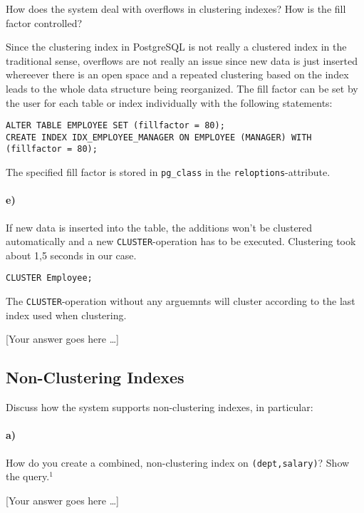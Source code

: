 \documentclass[11pt]{scrartcl}
\newcommand{\youranswerhere}{[Your answer goes here \ldots]}
\begin{document}
How does the system deal with overflows in clustering indexes? How is the fill factor controlled?

Since the clustering index in PostgreSQL is not really a clustered index in the traditional sense, overflows are not really an issue since new data is just inserted whereever there is an open space and a repeated clustering based on the index leads to the whole data structure being reorganized.
The fill factor can be set by the user for each table or index individually with the following statements:

\begin{lstlisting}[style=dbtsql]
ALTER TABLE EMPLOYEE SET (fillfactor = 80);
CREATE INDEX IDX_EMPLOYEE_MANAGER ON EMPLOYEE (MANAGER) WITH (fillfactor = 80);
\end{lstlisting}

The specified fill factor is stored in \texttt{pg\_class} in the \texttt{reloptions}-attribute.

\paragraph{e)}

If new data is inserted into the table, the additions won't be clustered automatically and a new \texttt{CLUSTER}-operation has to be executed. Clustering took about 1,5 seconds in our case.

\begin{lstlisting}[style=dbtsql]
CLUSTER Employee;
\end{lstlisting}

The \texttt{CLUSTER}-operation without any arguemnts will cluster according to the last index used when clustering.

\youranswerhere{}

\subsection{Non-Clustering Indexes}

Discuss how the system supports non-clustering indexes, in particular:


\paragraph{a)}

How do you create a combined, non-clustering index on \texttt{(dept,salary)}? Show the query.$^1$

\youranswerhere{}
\end{document}

